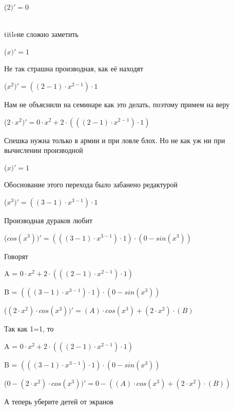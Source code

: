 \documentclass[12pt,a4paper,fleqn]{article}
\begin{document}
\begin{center}
 ($2)'
  = 0$\end{center}
\\ title{не сложно заметить} 

\begin{center}
 ($x)'
  = 1$\end{center}
Не так страшна производная, как её находят\cite{link2}

\begin{center}
 ($x^{2})'
  = ((2-1) \cdot x^{2-1}) \cdot 1$\end{center}
Нам не объяснили на семинаре как это делать, поэтому примем на веру

\begin{center}
 ($2 \cdot x^{2})'
  = 0 \cdot x^{2}+2 \cdot (((2-1) \cdot x^{2-1}) \cdot 1)$\end{center}
Спешка нужна только в армии и при ловле блох. Но не как уж ни при вычислении производной\cite{link2}

\begin{center}
 ($x)'
  = 1$\end{center}
Обоснование этого перехода было забанено редактурой

\begin{center}
 ($x^{3})'
  = ((3-1) \cdot x^{3-1}) \cdot 1$\end{center}
Производная дураков любит\cite{link2}

\begin{center}
 ($cos(x^{3}))'
  = (((3-1) \cdot x^{3-1}) \cdot 1) \cdot (0-sin(x^{3}))$\end{center}
Говорят

\begin{center}
A = $0 \cdot x^{2}+2 \cdot (((2-1) \cdot x^{2-1}) \cdot 1)$\end{center}
\begin{center}
B = $(((3-1) \cdot x^{3-1}) \cdot 1) \cdot (0-sin(x^{3}))$\end{center}
\begin{center}
 ($(2 \cdot x^{2}) \cdot cos(x^{3}))'
  = (A) \cdot cos(x^{3})+(2 \cdot x^{2}) \cdot (B)$\end{center}
Так как 1=1, то\cite{link4}

\begin{center}
A = $0 \cdot x^{2}+2 \cdot (((2-1) \cdot x^{2-1}) \cdot 1)$\end{center}
\begin{center}
B = $(((3-1) \cdot x^{3-1}) \cdot 1) \cdot (0-sin(x^{3}))$\end{center}
\begin{center}
 ($0-(2 \cdot x^{2}) \cdot cos(x^{3}))'
  = 0-((A) \cdot cos(x^{3})+(2 \cdot x^{2}) \cdot (B))$\end{center}
А теперь уберите детей от экранов
\end{document}
